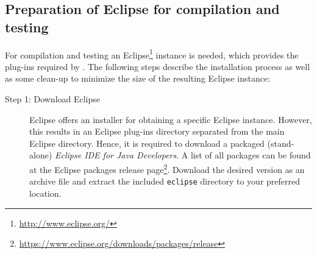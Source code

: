 \subsection{Preparation of Eclipse for compilation and testing}
\label{sec:Preparation of Eclipse}
For compilation and testing an Eclipse\footnote{\url{http://www.eclipse.org/}} instance is needed, which provides the plug-ins required by \EASy. The following steps describe the installation process as well as some clean-up to minimize the size of the resulting Eclipse instance:
\begin{description}
	\item[Step 1: Download Eclipse] $ $\\
		Eclipse offers an installer for obtaining a specific Eclipse instance. However, this results in an Eclipse plug-ins directory separated from the main Eclipse directory. Hence, it is required to download a packaged (stand-alone) \textit{Eclipse IDE for Java Developers}. A list of all packages can be found at the Eclipse packages release page\footnote{\url{https://www.eclipse.org/downloads/packages/release}}. Download the desired version as an archive file and extract the included \texttt{eclipse} directory to your preferred location. 
		

\end{description}
